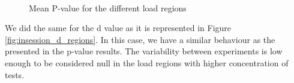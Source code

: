 \begin{figure}[h!]
	\centering
	\\
	\caption{Mean P-value for the different load regions}
	\label{fig:insession_p_regions}
\end{figure}

We did the same for the d value as it is represented in Figure \ref{fig:insession_d_regions}. In this case, we have a similar behaviour as the presented in the p-value results. The variability between experiments is low enough to be considered null in the load regions with higher concentration of tests.

